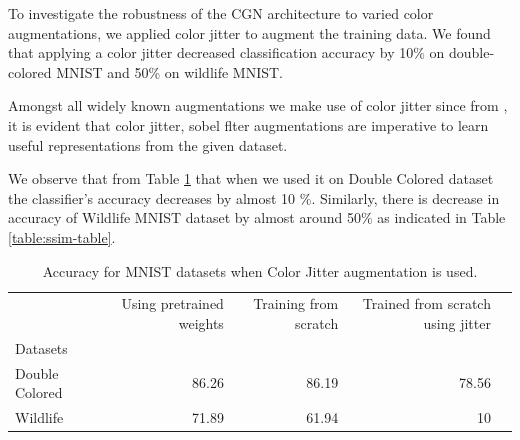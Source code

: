 To investigate the robustness of the CGN architecture \cite{sauer2021counterfactual} to varied color augmentations, we applied color jitter to augment the training data. We found that applying a color jitter decreased classification accuracy by 10\% on double-colored MNIST and 50\% on wildlife MNIST.


Amongst all widely known augmentations we make use of color jitter since from \cite{chen2020simple}, \cite{he2020momentum} it is evident that color jitter, sobel flter augmentations are imperative to learn useful representations from the given dataset. 

We observe that from Table \ref{table:colorjitter-table} that when we used it on Double Colored dataset the classifier's accuracy decreases by almost 10 \%. Similarly, there is decrease in accuracy of Wildlife MNIST dataset by almost around 50\% as indicated in Table \ref{table:ssim-table}. 


 


\begin{table}[h]
\centering
\tiny
\begin{tabular}{lrrrr}
\toprule
{} & Using pretrained weights &  Training from scratch & Trained from scratch using jitter\\
Datasets  &              &              &                            \\
\midrule
Double Colored              &        86.26  &        86.19 &         78.56  \\
Wildlife              &        71.89 &        61.94 &         10  \\
\bottomrule
\end{tabular}
\caption{Accuracy for MNIST datasets when Color Jitter augmentation is used.   }
\label{table:colorjitter-table}
\end{table}


